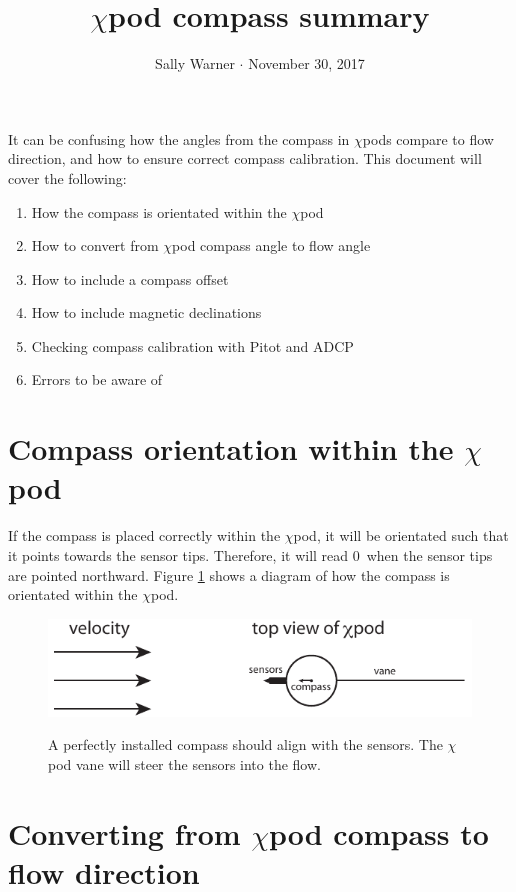 \documentclass[12pt]{article}
\title{$\chi$pod compass summary}
\author{Sally Warner $\cdot$ November 30, 2017}
\date{}
\begin{document}
\pagestyle{fancy}
\maketitle

It can be confusing how the angles from the compass in $\chi$pods compare to flow direction, and how to ensure correct compass calibration. This document will cover the following:
\begin{enumerate}
\item How the compass is orientated within the $\chi$pod
\item How to convert from $\chi$pod compass angle to flow angle
\item How to include a compass offset
\item How to include magnetic declinations
\item Checking compass calibration with Pitot and ADCP
\item Errors to be aware of
\end{enumerate}

\section{Compass orientation within the $\chi$pod}

If the compass is placed correctly within the $\chi$pod, it will be orientated such that it points towards the sensor tips. Therefore, it will read 0\degree \, when the sensor tips are pointed northward. Figure \ref{fig:cmpveldiag} shows a diagram of how the compass is orientated within the $\chi$pod. 

\begin{figure}
  \centering \centering\noindent\includegraphics[width=14cm,angle=0]{./figs/compass_and_velocity_diagram.pdf}\\
    \caption{A perfectly installed compass should align with the sensors. The $\chi$pod vane will steer the sensors into the flow.}\label{fig:cmpveldiag}
\end{figure}

\clearpage


\section{Converting from $\chi$pod compass to flow direction}
\end{document}
